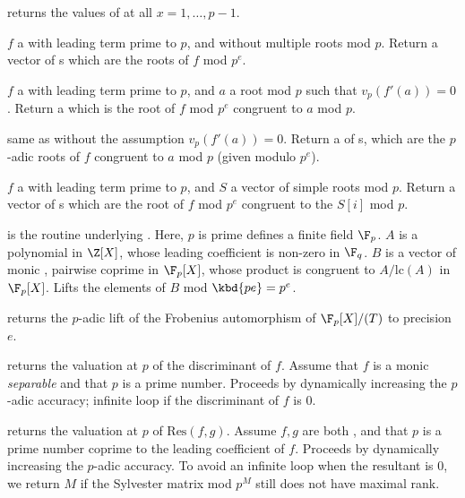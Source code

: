  returns the values of
 at all $x = 1, \dots, p-1$.


 $f$ a  with leading
term prime to $p$, and without multiple roots mod $p$. Return a vector
of s which are the roots of $f$ mod $p^e$.

 $f$ a  with
leading term prime to $p$, and $a$ a root mod $p$ such that
$v_p(f'(a))=0$.  Return a  which is the root of $f$ mod $p^e$
congruent to $a$ mod $p$.

 same as 
without the assumption $v_p(f'(a)) = 0$. Return a  of s,
which are the $p$-adic roots of $f$ congruent to $a$ mod $p$ (given modulo
$p^e$).

 $f$ a  with
leading term prime to $p$, and $S$ a vector of simple roots mod $p$. Return a
vector of s which are the root of $f$ mod $p^e$ congruent to the
$S[i]$ mod $p$.

 is
the routine underlying . Here, $p$ is prime
defines a finite field $\F_p$. $A$ is a polynomial in
$\Z[X]$, whose leading coefficient is non-zero in $\F_q$. $B$ is a vector of
monic , pairwise coprime in $\F_p[X]$, whose product is congruent to
$A/\text{lc}(A)$ in $\F_p[X]$. Lifts the elements of $B$ mod $\kbd{pe} = p^e$.

 returns the $p$-adic lift
of the Frobenius automorphism of $\F_p[X]/(T)$ to precision $e$.

 returns the valuation at $p$ of the
discriminant of $f$. Assume that $f$ is a monic \emph{separable} 
and that $p$ is a prime number. Proceeds by dynamically increasing the
$p$-adic accuracy; infinite loop if the discriminant of $f$ is
$0$.

 returns the
valuation at $p$ of $\text{Res}(f,g)$. Assume $f,g$ are both ,
and that $p$ is a prime number coprime to the leading coefficient of $f$.
Proceeds by dynamically increasing the $p$-adic accuracy.
To avoid an infinite loop when the resultant is $0$, we return $M$ if
the Sylvester matrix mod $p^M$ still does not have maximal rank.

